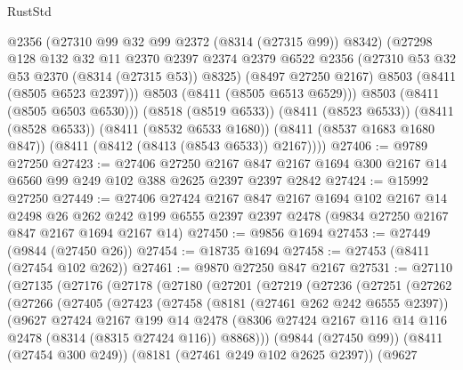 \begin{lexlean}{RustStd}
\begin{coremodule}
            @2356
            (@27310 @99 @32 @99 @2372 (@8314 (@27315 @99)) @8342)
            (@27298
              @128
              @132
              @32
              @11
              @2370
              @2397
              @2374
              @2379
              @6522
              @2356
              (@27310 @53 @32 @53 @2370 (@8314 (@27315 @53)) @8325)
              (@8497 @27250 @2167)
              @8503
              (@8411 (@8505 @6523 @2397)))
            @8503
            (@8411 (@8505 @6513 @6529)))
          @8503
          (@8411 (@8505 @6503 @6530)))
        (@8518 (@8519 @6533))
        (@8411 (@8523 @6533))
        (@8411 (@8528 @6533))
        (@8411 (@8532 @6533 @1680))
        (@8411 (@8537 @1683 @1680 @847))
        (@8411 (@8412 (@8413 (@8543 @6533)) @2167))))
@27406 := @9789 @27250
@27423 := @27406
    @27250
    @2167
    @847
    @2167
    @1694
    @300
    @2167
    @14
    @6560
    @99
    @249
    @102
    @388
    @2625
    @2397
    @2397
    @2842
@27424 := @15992 @27250
@27449 := @27406
    @27424
    @2167
    @847
    @2167
    @1694
    @102
    @2167
    @14
    @2498
    @26
    @262
    @242
    @199
    @6555
    @2397
    @2397
    @2478
    (@9834 @27250 @2167 @847 @2167 @1694 @2167 @14)
@27450 := @9856 @1694
@27453 := @27449 (@9844 (@27450 @26))
@27454 := @18735 @1694
@27458 := @27453 (@8411 (@27454 @102 @262))
@27461 := @9870 @27250 @847 @2167
@27531 := @27110
    (@27135
      (@27176
        (@27178
          (@27180
            (@27201
              (@27219
                (@27236
                  (@27251
                    (@27262
                      (@27266
                        (@27405
                          (@27423
                            (@27458
                              (@8181 (@27461 @262 @242 @6555 @2397))
                              (@9627
                                @27424
                                @2167
                                @199
                                @14
                                @2478
                                (@8306
                                  @27424
                                  @2167
                                  @116
                                  @14
                                  @116
                                  @2478
                                  (@8314 (@8315 @27424 @116))
                                  @8868)))
                            (@9844 (@27450 @99))
                            (@8411 (@27454 @300 @249))
                            (@8181 (@27461 @249 @102 @2625 @2397))
                            (@9627

\end{coremodule}
\end{lexlean}
